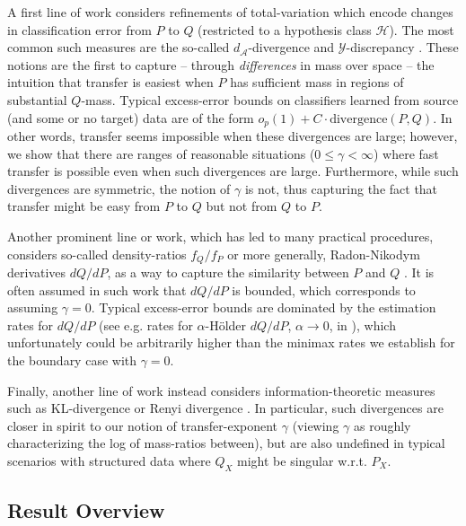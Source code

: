 \documentclass[final,12pt]{colt2018} %
\begin{document}
A first line of work considers refinements of total-variation which encode changes in classification error from $P$ to $Q$ (restricted to a hypothesis class $\mathcal{H}$). The most common such measures are the so-called $d_{\mathcal{A}}$-divergence \citep{ben2010theory, david2010impossibility, germain2013pac} and $\mathcal{Y}$-discrepancy \citep{mansour2009domain, mohri2012new, cortesadaptation}. These notions are the first to capture -- through \emph{differences} in mass over space -- the intuition that transfer is easiest when $P$ has sufficient mass in regions of substantial $Q$-mass. Typical excess-error bounds on classifiers learned from source (and some or no target) data are of the form $o_p(1) + C\cdot \text{divergence}(P, Q)$. In other words, 
transfer seems impossible when these divergences are large; however, we show that there are ranges of reasonable situations ($0\leq \gamma < \infty$) where fast transfer is possible even when such divergences are large. Furthermore, while such divergences are symmetric, the notion of $\gamma$ is not, thus capturing the fact that transfer might be easy from $P$ to $Q$ but not from $Q$ to $P$. 

Another prominent line or work, which has led to many practical procedures, considers so-called density-ratios $f_Q/f_P$ or more generally, Radon-Nikodym derivatives $dQ/dP$, as a way to capture the similarity between $P$ and $Q$ 
\citep{quionero2009dataset, sugiyama2012density}. It is often assumed in such work that $dQ/dP$ is bounded, 
which corresponds to assuming $\gamma = 0$. Typical excess-error bounds are dominated by the estimation rates for $dQ/dP$ (see e.g. rates for $\alpha$-H\"older $dQ/dP$, $\alpha\to 0$, in \cite{kpotufe2017lipschitz}), which unfortunately could be arbitrarily higher than the minimax rates we establish for the boundary case with $\gamma = 0$.

Finally, another line of work instead considers information-theoretic measures such as KL-divergence or Renyi divergence 
\citep{sugiyama2008direct, mansour2009multiple}. In particular, such divergences are closer in spirit to our notion of 
transfer-exponent $\gamma$ (viewing $\gamma$ as roughly characterizing the log of mass-ratios between), but are also undefined in typical scenarios with structured data where $Q_X$ might be singular w.r.t. $P_X$. 

\subsection*{Result Overview}
\end{document}
